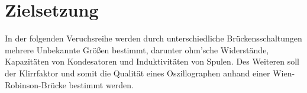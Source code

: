 \section{Zielsetzung}
\label{sec:Zielsetzung}

In der folgenden Veruchsreihe werden durch unterschiedliche Brückensschaltungen mehrere Unbekannte 
Größen bestimmt, darunter ohm'sche Widerstände, Kapazitäten von Kondesatoren und Induktivitäten 
von Spulen. Des Weiteren soll der Klirrfaktor und somit die Qualität eines Oszillographen anhand einer Wien-Robinson-Brücke 
bestimmt werden. 
